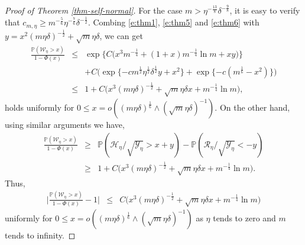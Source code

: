 \documentclass[12pt]{amsart}
\theoremstyle{definition}
\theoremstyle{remark}
\numberwithin{equation}{section}
\newcommand{\PP}{\mathbb{P}}
\begin{document}
\begin{proof}[Proof of Theorem \ref{thm-self-normal}]
For the case $m>\eta^{-\frac{13}8}\delta^{-\frac98}$, it is easy to verify that $c_{m,\eta}\ge m^{-\frac56}\eta^{-\frac76}\delta^{-\frac12}$. Combing \eqref{e:thm1}, \eqref{e:thm5} and \eqref{e:thm6} with $y=x^2(m\eta\delta)^{-\frac12}+\sqrt m\eta\delta$, we can get
\begin{eqnarray*}
	\frac{\PP(\mathcal W_\eta> x)}{1-\Phi(x)}
	&\le& \exp\big\{C\big(x^3m^{-\frac14}+(1+x)m^{-\frac14}\ln m+xy\big)\big\}\\
	&&+ C\big(\exp\{-cm^{\frac12}\eta^{\frac12}\delta^{\frac12}y+x^2\}+\exp\{-c(m^{\frac16}-x^2)\}\big)\\
	&\le& 1+  C\big(x^3(m\eta\delta)^{-\frac12}+\sqrt m\eta\delta x+ m^{-\frac14}\ln m\big),
\end{eqnarray*}
holds uniformly for $0\le x =o( (m\eta\delta)^{\frac16}\wedge (\sqrt m\eta\delta)^{-1})$. On the other hand, using similar arguments we have,
\begin{eqnarray*}
	\frac{\PP(\mathcal W_\eta> x)}{1-\Phi(x)}
	&\ge& 
	\PP(\mathcal H_\eta/\sqrt{\mathcal Y_\eta}>x+y)-\PP(\mathcal R_\eta/\sqrt{\mathcal Y_\eta}<-y)\\
	&\ge& 1+  C\big(x^3(m\eta\delta)^{-\frac12}+\sqrt m\eta\delta x+ m^{-\frac14}\ln m\big).
\end{eqnarray*}
Thus,
\begin{eqnarray*}
	\Big| \frac{\PP(\mathcal W_\eta> x)}{1-\Phi(x)}
	-1 \Big| & \le & 
	 C\big(x^3(m\eta\delta)^{-\frac12}+\sqrt m\eta\delta x+ m^{-\frac14}\ln m\big)
\end{eqnarray*}
uniformly for $0\le x=o( (m\eta\delta)^{\frac16}\wedge (\sqrt m\eta\delta)^{-1})$ as $\eta$ tends to zero and $m$ tends to infinity. 

\end{proof}
\end{document}
